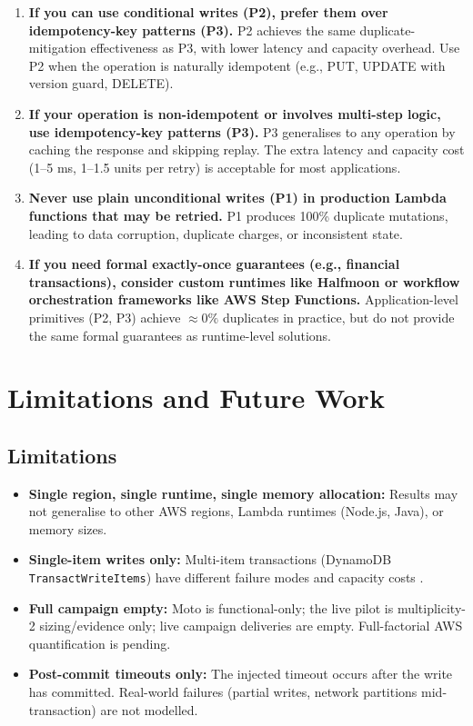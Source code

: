 \begin{enumerate}
    \item \textbf{If you can use conditional writes (P2), prefer them over idempotency-key patterns (P3).} P2 achieves the same duplicate-mitigation effectiveness as P3, with lower latency and capacity overhead. Use P2 when the operation is naturally idempotent (e.g., PUT, UPDATE with version guard, DELETE).
    \item \textbf{If your operation is non-idempotent or involves multi-step logic, use idempotency-key patterns (P3).} P3 generalises to any operation by caching the response and skipping replay. The extra latency and capacity cost (1--5 ms, 1--1.5 units per retry) is acceptable for most applications.
    \item \textbf{Never use plain unconditional writes (P1) in production Lambda functions that may be retried.} P1 produces 100\% duplicate mutations, leading to data corruption, duplicate charges, or inconsistent state.
    \item \textbf{If you need formal exactly-once guarantees (e.g., financial transactions), consider custom runtimes like Halfmoon or workflow orchestration frameworks like AWS Step Functions.} Application-level primitives (P2, P3) achieve $\approx 0\%$ duplicates in practice, but do not provide the same formal guarantees as runtime-level solutions.
\end{enumerate}

\section{Limitations and Future Work}

\subsection{Limitations}

\begin{itemize}
    \item \textbf{Single region, single runtime, single memory allocation:} Results may not generalise to other AWS regions, Lambda runtimes (Node.js, Java), or memory sizes.
    \item \textbf{Single-item writes only:} Multi-item transactions (DynamoDB \texttt{TransactWriteItems}) have different failure modes and capacity costs \citep{Idziorek2023DynamoDBTx}.
    \item \textbf{Full campaign empty:} Moto is functional-only; the live pilot is multiplicity-2 sizing/evidence only; live campaign deliveries are empty. Full-factorial AWS quantification is pending.
    \item \textbf{Post-commit timeouts only:} The injected timeout occurs after the write has committed. Real-world failures (partial writes, network partitions mid-transaction) are not modelled.
\end{itemize}

